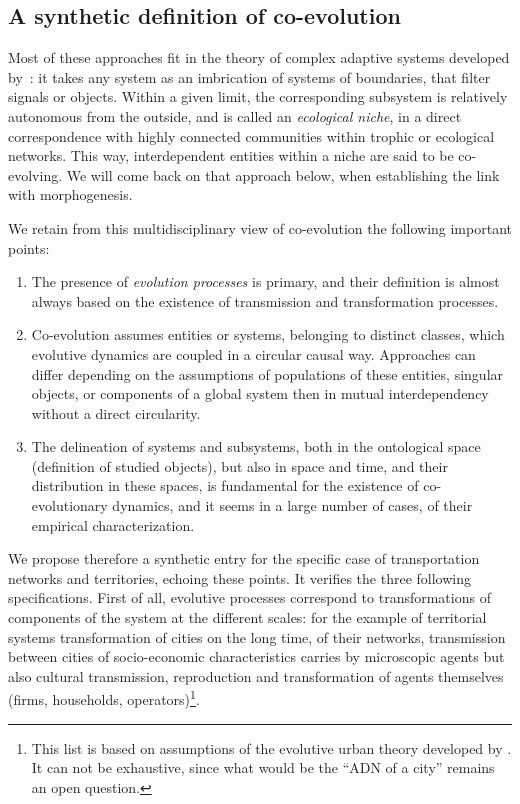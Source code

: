 \documentclass[letterpaper]{article}
\begin{document}
\subsection{A synthetic definition of co-evolution}


Most of these approaches fit in the theory of complex adaptive systems developed by~\cite{holland2012signals}: it takes any system as an imbrication of systems of boundaries, that filter signals or objects. Within a given limit, the corresponding subsystem is relatively autonomous from the outside, and is called an \emph{ecological niche}, in a direct correspondence with highly connected communities within trophic or ecological networks. This way, interdependent entities within a niche are said to be co-evolving. We will come back on that approach below, when establishing the link with morphogenesis.


We retain from this multidisciplinary view of co-evolution the following important points:

\begin{enumerate}
	\item The presence of \emph{evolution processes} is primary, and their definition is almost always based on the existence of transmission and transformation processes.
	\item Co-evolution assumes entities or systems, belonging to distinct classes, which evolutive dynamics are coupled in a circular causal way. Approaches can differ depending on the assumptions of populations of these entities, singular objects, or components of a global system then in mutual interdependency without a direct circularity.
	\item The delineation of systems and subsystems, both in the ontological space (definition of studied objects), but also in space and time, and their distribution in these spaces, is fundamental for the existence of co-evolutionary dynamics, and it seems in a large number of cases, of their empirical characterization.
\end{enumerate}



We propose therefore a synthetic entry for the specific case of transportation networks and territories, echoing these points. It verifies the three following specifications. First of all, evolutive processes correspond to transformations of components of the system at the different scales: for the example of territorial systems transformation of cities on the long time, of their networks, transmission between cities of socio-economic characteristics carries by microscopic agents but also cultural transmission, reproduction and transformation of agents themselves (firms, households, operators)\footnote{This list is based on assumptions of the evolutive urban theory developed by \cite{pumain2008socio}. It can not be exhaustive, since what would be the ``ADN of a city'' remains an open question.}.
\end{document}
